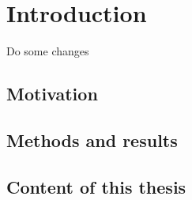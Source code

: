 \chapter{Introduction}

Do some changes

\section{Motivation}
\section{Methods and results}
\section{Content of this thesis}
\clearpage{\pagestyle{empty}\cleardoublepage}
